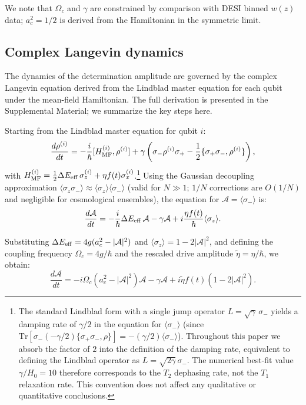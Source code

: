 \documentclass[aps,prd,twocolumn,superscriptaddress]{revtex4-2}
\begin{document}
We note that $\Omega_c$ and $\gamma$ are constrained by comparison with DESI binned $w(z)$ data; $a_c^2 = 1/2$ is derived from the Hamiltonian in the symmetric limit.

\subsection{Complex Langevin dynamics}

The dynamics of the determination amplitude are governed by the complex Langevin equation derived from the Lindblad master equation for each qubit under the mean-field Hamiltonian. The full derivation is presented in the Supplemental Material; we summarize the key steps here.

Starting from the Lindblad master equation for qubit $i$:
\begin{equation}
\frac{d\rho^{(i)}}{dt} = -\frac{i}{\hbar}[H_{\rm MF}^{(i)}, \rho^{(i)}] + \gamma\left(\sigma_-\rho^{(i)}\sigma_+ - \frac{1}{2}\{\sigma_+\sigma_-, \rho^{(i)}\}\right),
\end{equation}
with $H_{\rm MF}^{(i)} = \frac{1}{2}\Delta E_{\rm eff}\,\sigma_z^{(i)} + \eta f(t)\sigma_x^{(i)}$.\footnote{The standard Lindblad form with a single jump operator $L = \sqrt{\gamma}\,\sigma_-$ yields a damping rate of $\gamma/2$ in the equation for $\langle\sigma_-\rangle$ (since $\mathrm{Tr}[\sigma_-(-\gamma/2)\{\sigma_+\sigma_-,\rho\}] = -(\gamma/2)\langle\sigma_-\rangle$). Throughout this paper we absorb the factor of $2$ into the definition of the damping rate, equivalent to defining the Lindblad operator as $L = \sqrt{2\gamma}\,\sigma_-$. The numerical best-fit value $\gamma/H_0 = 10$ therefore corresponds to the $T_2$ dephasing rate, not the $T_1$ relaxation rate. This convention does not affect any qualitative or quantitative conclusions.} Using the Gaussian decoupling approximation $\langle\sigma_z\sigma_-\rangle \approx \langle\sigma_z\rangle\langle\sigma_-\rangle$ (valid for $N \gg 1$; $1/N$ corrections are $O(1/N)$ and negligible for cosmological ensembles), the equation for $\mathcal{A} = \langle\sigma_-\rangle$ is:
\begin{equation}
\frac{d\mathcal{A}}{dt} = -\frac{i}{\hbar}\Delta E_{\rm eff}\,\mathcal{A} - \gamma\mathcal{A} + i\frac{\eta f(t)}{\hbar}\langle\sigma_z\rangle.
\label{eq:lindblad_raw}
\end{equation}

Substituting $\Delta E_{\rm eff} = 4g(a_c^2 - |\mathcal{A}|^2)$ and $\langle\sigma_z\rangle = 1-2|\mathcal{A}|^2$, and defining the coupling frequency $\Omega_c = 4g/\hbar$ and the rescaled drive amplitude $\tilde{\eta} = \eta/\hbar$, we obtain:
\begin{equation}
\boxed{\frac{d\mathcal{A}}{dt} = -i\Omega_c\left(a_c^2 - |\mathcal{A}|^2\right)\mathcal{A} - \gamma\mathcal{A} + i\tilde{\eta}f(t)(1-2|\mathcal{A}|^2)}.
\label{eq:langevin}
\end{equation}
\end{document}
